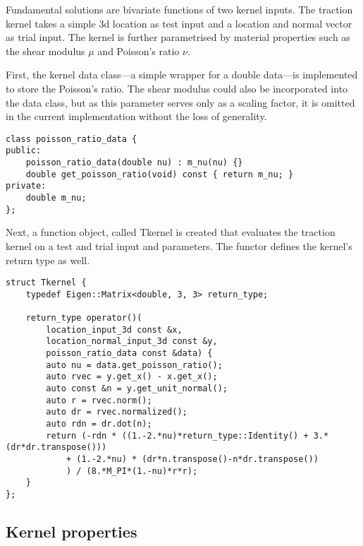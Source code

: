 \documentclass{article}
\begin{document}
Fundamental solutions are bivariate functions of two kernel inputs.
The traction kernel takes a simple 3d location as test input and a location and normal vector as trial input.
The kernel is further parametrised by material properties such as the shear modulus $\mu$ and Poisson's ratio $\nu$.

First, the kernel data class---a simple wrapper for a double data---is implemented to store the Poisson's ratio.
The shear modulus could also be incorporated into the data class, but as this parameter serves only as a scaling factor, it is omitted in the current implementation without the loss of generality.

\begin{lstlisting}
class poisson_ratio_data {
public:
	poisson_ratio_data(double nu) :	m_nu(nu) {}
	double get_poisson_ratio(void) const { return m_nu; }
private:
	double m_nu;
};
\end{lstlisting}

Next, a function object, called Tkernel is created that evaluates the traction kernel on a test and trial input and parameters.
The functor defines the kernel's return type as well. %
%
\begin{lstlisting}
struct Tkernel {
	typedef Eigen::Matrix<double, 3, 3> return_type;
	
	return_type operator()(
		location_input_3d const &x,
		location_normal_input_3d const &y,
		poisson_ratio_data const &data) {
		auto nu = data.get_poisson_ratio();
		auto rvec = y.get_x() - x.get_x();
		auto const &n = y.get_unit_normal();
		auto r = rvec.norm();
		auto dr = rvec.normalized();
		auto rdn = dr.dot(n);
		return (-rdn * ((1.-2.*nu)*return_type::Identity() + 3.*(dr*dr.transpose()))
			+ (1.-2.*nu) * (dr*n.transpose()-n*dr.transpose())
			) / (8.*M_PI*(1.-nu)*r*r);
	}
};
\end{lstlisting}

\subsection{Kernel properties}
\end{document}
